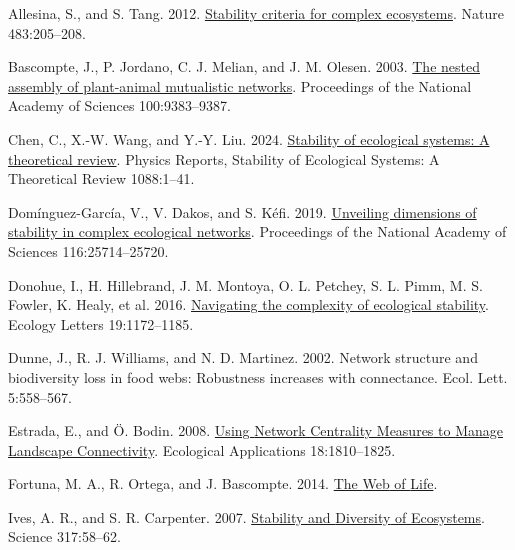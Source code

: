 \documentclass[
]{article}
\newlength{\cslhangindent}
\newenvironment{CSLReferences}[2] %
 {\begin{list}{}{%
  \setlength{\itemindent}{0pt}
  \setlength{\leftmargin}{0pt}
  \setlength{\parsep}{0pt}
  \ifodd #1
   \setlength{\leftmargin}{\cslhangindent}
   \setlength{\itemindent}{-1\cslhangindent}
  \fi
  \setlength{\itemsep}{#2\baselineskip}}}
 {\end{list}}
\begin{document}
\protect{}\label{refs}
\begin{CSLReferences}{0}{0}
Allesina, S., and S. Tang. 2012.
\href{https://doi.org/10.1038/nature10832}{Stability criteria for
complex ecosystems}. Nature 483:205--208.

Bascompte, J., P. Jordano, C. J. Melian, and J. M. Olesen. 2003.
\href{https://doi.org/10.1073/pnas.1633576100}{The nested assembly of
plant-animal mutualistic networks}. Proceedings of the National Academy
of Sciences 100:9383--9387.

Chen, C., X.-W. Wang, and Y.-Y. Liu. 2024.
\href{https://doi.org/10.1016/j.physrep.2024.08.001}{Stability of
ecological systems: {A} theoretical review}. Physics Reports, Stability
of {Ecological Systems}: {A Theoretical Review} 1088:1--41.

Domínguez-García, V., V. Dakos, and S. Kéfi. 2019.
\href{https://doi.org/10.1073/pnas.1904470116}{Unveiling dimensions of
stability in complex ecological networks}. Proceedings of the National
Academy of Sciences 116:25714--25720.

Donohue, I., H. Hillebrand, J. M. Montoya, O. L. Petchey, S. L. Pimm, M.
S. Fowler, K. Healy, et al. 2016.
\href{https://doi.org/10.1111/ele.12648}{Navigating the complexity of
ecological stability}. Ecology Letters 19:1172--1185.

Dunne, J., R. J. Williams, and N. D. Martinez. 2002. Network structure
and biodiversity loss in food webs: Robustness increases with
connectance. Ecol. Lett. 5:558--567.

Estrada, E., and Ö. Bodin. 2008.
\href{https://doi.org/10.1890/07-1419.1}{Using {Network Centrality
Measures} to {Manage Landscape Connectivity}}. Ecological Applications
18:1810--1825.

Fortuna, M. A., R. Ortega, and J. Bascompte. 2014.
\href{https://doi.org/10.48550/arXiv.1403.2575}{The {Web} of {Life}}.

Ives, A. R., and S. R. Carpenter. 2007.
\href{https://doi.org/10.1126/science.1133258}{Stability and {Diversity}
of {Ecosystems}}. Science 317:58--62.


\end{CSLReferences}
\end{document}
